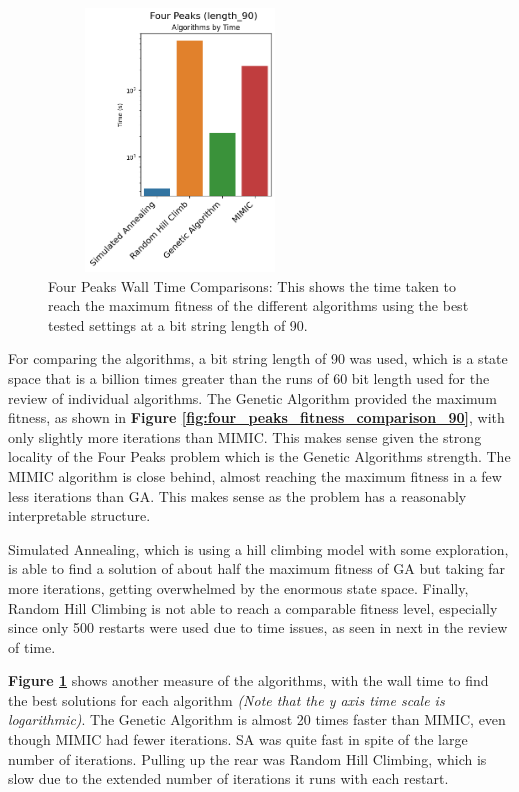 \documentclass[letterpaper]{article} %
\begin{document}
\begin{figure}[!htb]
\centering
\includegraphics[width=2.75in, height=2.75in]{figures/Four_Peaks_length_90_Algorithms_by_Time_.png}
\caption{Four Peaks Wall Time Comparisons: This shows the time taken to reach the maximum fitness of the different algorithms using the best tested settings at a bit string length of 90.  }
\label{fig:four_peaks_walltime_comparison_90}
\end{figure}

For comparing the algorithms, a bit string length of 90 was used, which is a state space that is a billion times greater than the runs of 60 bit length used for the review of individual algorithms.  The Genetic Algorithm provided the maximum fitness, as shown in \textbf{Figure \ref{fig:four_peaks_fitness_comparison_90}}, with only slightly more iterations than MIMIC.  This makes sense given the strong locality of the Four Peaks problem which is the Genetic Algorithms strength.  The MIMIC algorithm is close behind, almost reaching the maximum fitness in a few less iterations than GA.  This makes sense as the problem has a reasonably interpretable structure. 

Simulated Annealing, which is using a hill climbing model with some exploration, is able to find a solution of about half the maximum fitness of GA but taking far more iterations, getting overwhelmed by the enormous state space. Finally, Random Hill Climbing is not able to reach a comparable fitness level, especially since only 500 restarts were used due to time issues, as seen in next in the review of time.

\textbf{Figure \ref{fig:four_peaks_walltime_comparison_90}} shows another measure of the algorithms, with the wall time to find the best solutions for each algorithm \emph{(Note that the y axis time scale is logarithmic)}. The Genetic Algorithm is almost 20 times faster than MIMIC, even though MIMIC had fewer iterations.  SA was quite fast in spite of the large number of iterations.  Pulling up the rear was Random Hill Climbing, which is slow due to the extended number of iterations it runs with each restart.
\end{document}
